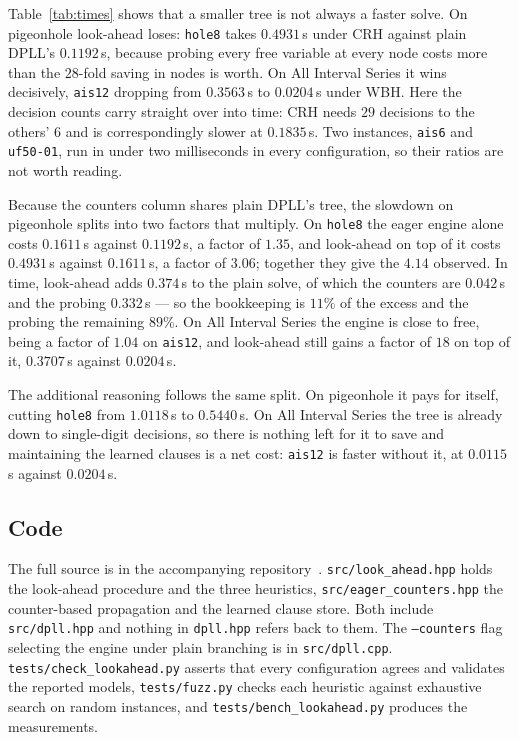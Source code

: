 \documentclass[11pt,a4paper]{article}
\begin{document}


Table~\ref{tab:times} shows that a smaller tree is not always a faster solve.
On pigeonhole look-ahead loses: \texttt{hole8} takes $0.4931$\,s under CRH
against plain DPLL's $0.1192$\,s, because probing every free variable at every
node costs more than the $28$-fold saving in nodes is worth. On All Interval
Series it wins decisively, \texttt{ais12} dropping from $0.3563$\,s to
$0.0204$\,s under WBH. Here the decision counts carry straight over into time:
CRH needs $29$ decisions to the others' $6$ and is correspondingly slower at
$0.1835$\,s. Two instances, \texttt{ais6} and \texttt{uf50-01}, run in under
two milliseconds in every configuration, so their ratios are not worth reading.

Because the counters column shares plain DPLL's tree, the slowdown on 
pigeonhole splits into two factors that multiply.
On \texttt{hole8} the eager engine alone costs $0.1611$\,s against
$0.1192$\,s, a factor of $1.35$, and look-ahead on top of it costs
$0.4931$\,s against $0.1611$\,s, a factor of $3.06$; together they give the
$4.14$ observed. In time, look-ahead adds $0.374$\,s to the plain solve, of
which the counters are $0.042$\,s and the probing $0.332$\,s --- so the
bookkeeping is $11\%$ of the excess and the probing the remaining $89\%$. On All Interval Series
the engine is close to free, being a factor of $1.04$ on \texttt{ais12}, and
look-ahead still gains a factor of $18$ on top of it, $0.3707$\,s against
$0.0204$\,s.

The additional reasoning follows the same split. On pigeonhole it pays for
itself, cutting \texttt{hole8} from $1.0118$\,s to $0.5440$\,s. On All Interval
Series the tree is already down to single-digit decisions, so there is nothing
left for it to save and maintaining the learned clauses is a net cost:
\texttt{ais12} is faster without it, at $0.0115$\,s against $0.0204$\,s.

\subsection*{Code}

\begin{sloppypar}
The full source is in the accompanying repository~\cite{repo}.
\texttt{src/look\_ahead.hpp} holds the look-ahead procedure and the three
heuristics, \texttt{src/eager\_counters.hpp} the counter-based propagation and
the learned clause store. Both include \texttt{src/dpll.hpp} and nothing in
\texttt{dpll.hpp} refers back to them.
The \texttt{--counters} flag selecting the engine under plain branching is in
\texttt{src/dpll.cpp}.
\texttt{tests/check\_lookahead.py} asserts that every configuration agrees and
validates the reported models, \texttt{tests/fuzz.py} checks each heuristic
against exhaustive search on random instances, and
\texttt{tests/bench\_lookahead.py} produces the measurements.
\end{sloppypar}
\end{document}
